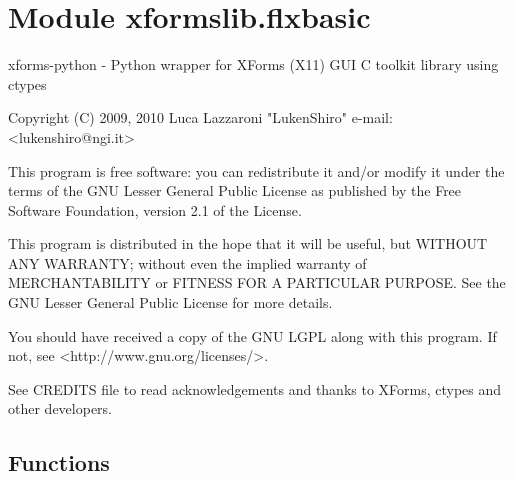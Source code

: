 %
%
%


\section{Module xformslib.flxbasic}

    \label{xformslib:flxbasic}
xforms-python - Python wrapper for XForms (X11) GUI C toolkit library using
ctypes

Copyright (C) 2009, 2010  Luca Lazzaroni "LukenShiro" e-mail: 
{\textless}lukenshiro@ngi.it{\textgreater}

This program is free software: you can redistribute it and/or modify it 
under the terms of the GNU Lesser General Public License as published by 
the Free Software Foundation, version 2.1 of the License.

This program is distributed in the hope that it will be useful, but WITHOUT
ANY WARRANTY; without even the implied warranty of MERCHANTABILITY or 
FITNESS FOR A PARTICULAR PURPOSE. See the GNU Lesser General Public License
for more details.

You should have received a copy of the GNU LGPL along with this program. If
not, see {\textless}http://www.gnu.org/licenses/{\textgreater}.

See CREDITS file to read acknowledgements and thanks to XForms, ctypes and 
other developers.



  \subsection{Functions}

    \label{xformslib:flxbasic:FL_is_gray}

